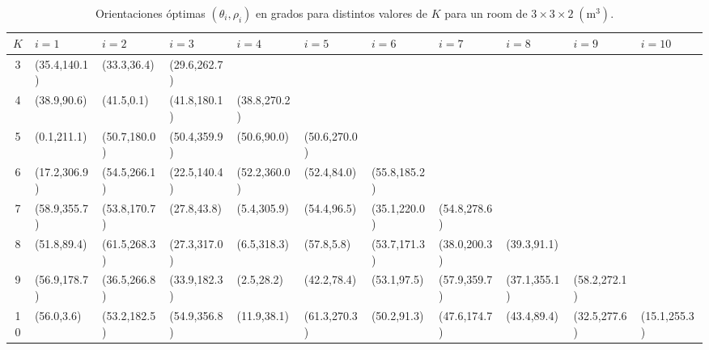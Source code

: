 \documentclass[lettersize,journal]{IEEEtran}
\begin{document}
\begin{table}[ht]
\centering
\caption{Orientaciones óptimas \((\theta_i,\rho_i)\) en grados para distintos valores de \(K\) para un room de $3\times 3 \times 2\; (\mathrm{m^3})$.}
\label{tab:optimal_orientations_2col}
\begin{tabular}{c*{10}{>{\centering\arraybackslash}p{1.2cm}}}
\toprule
\(K\) 
    & \(i=1\)       & \(i=2\)       & \(i=3\)       & \(i=4\)       & \(i=5\)       & \(i=6\)       & \(i=7\)       & \(i=8\)       & \(i=9\)       & \(i=10\)      \\
\midrule
3   & (35.4,140.1)  & (33.3,36.4)   & (29.6,262.7)  &               &               &               &               &               &               &               \\
4   & (38.9,90.6)   & (41.5,0.1)    & (41.8,180.1)  & (38.8,270.2)  &               &               &               &               &               &               \\
5   & (0.1,211.1)   & (50.7,180.0)  & (50.4,359.9)  &  (50.6,90.0)  & (50.6,270.0)  &               &               &               &               &               \\
6   & (17.2,306.9)  & (54.5,266.1)  & (22.5,140.4)  & (52.2,360.0)  & (52.4,84.0)   & (55.8,185.2)  &               &               &               &               \\
7   & (58.9,355.7)  & (53.8,170.7)  & (27.8,43.8)   & (5.4,305.9)   & (54.4,96.5)   & (35.1,220.0)  & (54.8,278.6)  &               &               &               \\
8   & (51.8,89.4)   & (61.5,268.3)  & (27.3,317.0)  & (6.5,318.3)   & (57.8,5.8)    & (53.7,171.3)  & (38.0,200.3)  & (39.3,91.1)   &               &               \\
9   & (56.9,178.7)  & (36.5,266.8)  & (33.9,182.3)  & (2.5,28.2)    & (42.2,78.4)   & (53.1,97.5)   & (57.9,359.7)  & (37.1,355.1)  & (58.2,272.1)  &               \\
10  & (56.0,3.6)    & (53.2,182.5)  & (54.9,356.8)  & (11.9,38.1)   & (61.3,270.3)  & (50.2,91.3)   & (47.6,174.7)  & (43.4,89.4)   & (32.5,277.6)  & (15.1,255.3)  \\
\bottomrule
\end{tabular}
\end{table}
\end{document}
